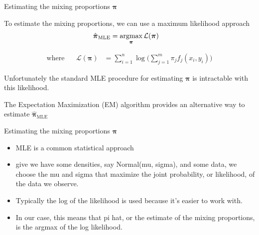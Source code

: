 \documentclass{beamer}
\newcommand{\eqn}[1]{\begin{align*}
#1
\end{align*}}
\newcommand{\vect}[1]{\boldsymbol{\mathbf{#1}}}
\newcommand{\script}[1]{\mathcal{#1}}
\newcommand{\argmax}{\operatornamewithlimits{argmax}}
\newcommand{\leftlbl}[1]{\mbox{#1} \;\;\;\;\;\;}
\newcommand{\vp}{\vect{\pi}}
\newcommand{\vph}{\hat{\vect{\pi}}}
\newcommand{\sumn}{\sum^n_{i=1}}
\newcommand{\summ}{\sum^m_{j=1}}
\newcommand{\fab}{f_j}
\begin{document}
\begin{frame}{Estimating the mixing proportions $\vect{\pi}$}
	
	To estimate the mixing proportions, we can use a maximum likelihood approach
	\eqn{
		\vph_{\text{MLE}} &= \argmax_{\vp} \script{L}(\vect{\pi})
	}
	
	
	
	\eqn{
		\leftlbl{where} \script{L}(\vect{\pi}) &= \sumn \log \Big( \summ \pi_j \fab(x_i,y_i)  \Big)
	}
	
	Unfortunately the standard MLE procedure for estimating $\vp$ is intractable with this likelihood.\newline
	
	The Expectation Maximization (EM) algorithm provides an alternative way to estimate $\vph_{\text{MLE}}$
	
	
	
\end{frame}
\begin{frame}[shrink]{Estimating the mixing proportions $\vect{\pi}$}
	
	\begin{itemize}
		\item MLE is a common statistical approach
		\item give we have some densities, say Normal(mu, sigma), and some data, we choose the mu and sigma that maximize the joint probability, or likelihood, of the data we observe.
		\item Typically the log of the likelihood is used because it's easier to work with.
		\item In our case, this means that pi hat, or the estimate of the mixing proportions, is the argmax of the log likelihood.
	\end{itemize}
	
\end{frame}
\end{document}
